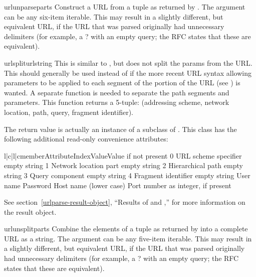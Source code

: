 \begin{funcdesc}{urlunparse}{parts}
Construct a URL from a tuple as returned by .
The  argument can be any six-item iterable.
This may result in a slightly different, but equivalent URL, if the
URL that was parsed originally had unnecessary delimiters (for example,
a ? with an empty query; the RFC states that these are equivalent).
\end{funcdesc}

\begin{funcdesc}{urlsplit}{urlstring}
This is similar to , but does not split the
params from the URL.  This should generally be used instead of
 if the more recent URL syntax allowing
parameters to be applied to each segment of the  portion of
the URL (see ) is wanted.  A separate function is needed to
separate the path segments and parameters.  This function returns a
5-tuple: (addressing scheme, network location, path, query, fragment
identifier).

The return value is actually an instance of a subclass of
.  This class has the following additional read-only
convenience attributes:

\begin{tableiv}{l|c|l|c}{member}{Attribute}{Index}{Value}{Value if not present}
     {0} {URL scheme specifier}   {empty string}
     {1} {Network location part}  {empty string}
       {2} {Hierarchical path}      {empty string}
      {3} {Query component}        {empty string}
   {4} {Fragment identifier}    {empty string}
   { } {User name}              {}
   { } {Password}               {}
   { } {Host name (lower case)} {}
       { } {Port number as integer, if present} {}
\end{tableiv}

See section~\ref{urlparse-result-object}, ``Results of
 and ,'' for more
information on the result object.

\end{funcdesc}

\begin{funcdesc}{urlunsplit}{parts}
Combine the elements of a tuple as returned by 
into a complete URL as a string.
The  argument can be any five-item iterable.
This may result in a slightly different, but equivalent URL, if the
URL that was parsed originally had unnecessary delimiters (for example,
a ? with an empty query; the RFC states that these are equivalent).
\end{funcdesc}

